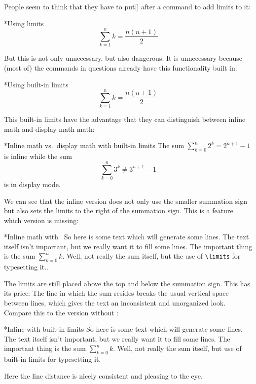 People seem to think that they have to put[\comname] after a command to add limits to it:
\begin{showlatex}*{Using limits}
\[
  \sum\limits_{k=1}^n k
  =
  \frac{n(n+1)}{2}
\]
\end{showlatex}
But this is not only unnecessary, but also dangerous.
It is unnecessary because (most of) the commands in questions already have this functionality built in:
\begin{showlatex}*{Using built-in limits}
\[
  \sum_{k=1}^n k
  =
  \frac{n(n+1)}{2}
\]
\end{showlatex}
This built-in limits have the advantage that they can distinguish between inline math and display math math:
\begin{showlatex}*{Inline math vs.\ display math with built-in limits}
The sum $\sum_{k=0}^n 2^k = 2^{n+1} - 1$ is inline while the sum
\[
  \sum_{k=0}^n 3^k
  \neq
  3^{n+1} - 1
\]
is in display mode.
\end{showlatex}
We can see that the inline version does not only use the smaller summation sign but also sets the limits to the right of the summation sign.
This is a feature which  version is missing:
\begin{showlatex}*{Inline math with~}
So here is some text which will generate some lines.
The text itself isn’t important, but we really want it to fill some lines.
The important thing is the sum $\sum\limits_{k=0}^n k$.
Well, not really the sum itself, but the use of \texttt{{\textbackslash}limits} for typesetting it..
\end{showlatex}
The limits are still placed above the top and below the summation sign.
This has its price:
The line in which the sum resides breaks the usual vertical space between lines, which gives the text an inconsistent and unorganized look.
Compare this to the version without :
\begin{showlatex}*{Inline with built-in limits}
So here is some text which will generate some lines.
The text itself isn’t important, but we really want it to fill some lines.
The important thing is the sum $\sum_{k=0}^n k$.
Well, not really the sum itself, but use of built-in limits for typesetting it.
\end{showlatex}
Here the line distance is nicely consistent and pleasing to the eye.

